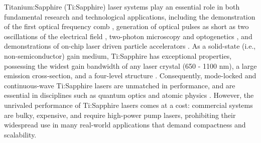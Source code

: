 \documentclass[amsmath, amsthm, amssymb, aps, prb, superscriptaddress, twocolumn, nofootinbib, 10pt]{revtex4-1}%
\begin{document}
Titanium:Sapphire (Ti:Sapphire) laser systems \cite{moulton1982ti, moulton1986spectroscopic} play an essential role in both fundamental research and technological applications, including the demonstration of the first optical frequency comb \cite{holzwarth2000optical}, generation of optical pulses as short as two oscillations of the electrical field \cite{morgner1999sub}, two-photon microscopy and optogenetics \cite{helmchen2005deep, prakash2012two, xu1996measurement}, and demonstrations of on-chip laser driven particle accelerators \cite{leedle2015laser, kfir2020controlling}. 
As a solid-state (i.e., non-semiconductor) gain medium, Ti:Sapphire has exceptional properties, possessing the widest gain bandwidth of any laser crystal (650 - 1100 nm), a large emission cross-section, and a four-level structure \cite{moulton1986spectroscopic}. Consequently, mode-locked and continuous-wave Ti:Sapphire lasers are unmatched in performance, and are essential in disciplines such as quantum optics and atomic physics \cite{hayes2010entanglement, santori2002indistinguishable, rugar2021quantum, semeghini2021probing, ebadi2021quantum}. 
However, the unrivaled performance of Ti:Sapphire lasers comes at a cost: commercial systems are bulky, expensive, and require high-power pump lasers, prohibiting their widespread use in many real-world applications that demand compactness and scalability. 
\end{document}
